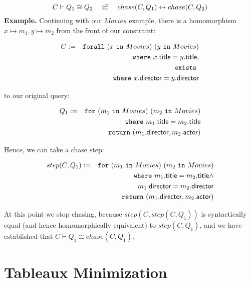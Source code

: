 \documentclass[preprint]{sigplanconf}
\newcommand{\FOR}{{\tt for} \ }
\newcommand{\FORALL}{{\tt forall} \ }
\newcommand{\EXISTS}{{\tt exists} \ }
\newcommand{\WHERE}{{\tt where} \ }
\newcommand{\IN}{ \ {\tt in} \ }
\newcommand{\RETURN}{{\tt return} \ }
\begin{document}
$$
C \vdash Q_1 \cong Q_2 \ \ \ \  \textnormal{iff} \ \ \ \ chase(C,Q_1) \leftrightarrow chase(C, Q_2)
$$
{\bf Example.} Continuing with our $Movies$ example, there is a homomorphism $x \mapsto 
m_1, y \mapsto m_2$ from the front of our constraint: 
\begin{normalsize}
\begin{eqnarray*}
C& := & \FORALL (x \IN Movies) \ (y \IN Movies) \\
& & \WHERE x.{\sf title} = y.{\sf title}, \\ 
& & \EXISTS \\
& & \WHERE x.{\sf director} = y.{\sf director}
\end{eqnarray*}
\end{normalsize}
to our original query:
\begin{normalsize}
\begin{eqnarray*}
Q_1 & := & \FOR (m_1 \IN Movies) \ (m_2 \IN Movies) \\
 & & \WHERE m_1.{\sf title} = m_2.{\sf title} \\
 & & \RETURN (m_1.{\sf director}, m_2.{\sf actor})
\end{eqnarray*}
\end{normalsize}
Hence, we can take a chase step: 
\begin{normalsize}
\begin{eqnarray*}
step(C, Q_1) := & & \FOR (m_1 \IN Movies) \ (m_2 \IN Movies) \\
 & & \WHERE m_1.{\sf title} = m_2.{\sf title} \wedge \\
 & & \ \ \ \ \ \ \ \ \ \ \ \  m_1.{\sf director} = m_2.{\sf 
director} \\
 & & \RETURN (m_1.{\sf director}, m_2.{\sf actor})
\end{eqnarray*}
\end{normalsize}
At this point we stop chasing, because $step(C, step(C, Q_1))$ is syntactically equal (and hence homomorphically equivalent) to $step(C, Q_1)$, and we have established that $C \vdash Q_1 \cong chase(C, Q_1)$. %

\section{Tableaux Minimization}
\label{sec:minimize}
\end{document}
